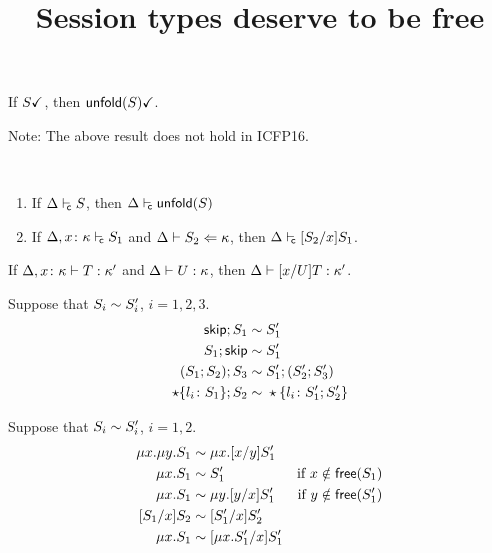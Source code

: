 \documentclass{article}
\title{Session types deserve to be free}
\begin{document}



\begin{lemma}
  If $\done S$, then $\done{\unfoldk(S)}$.  
\end{lemma}

Note: The above result does not hold in ICFP16.

\begin{lemma}\
  \begin{enumerate}
  \item If $\isContr S$, then $\isContr{\unfoldk(S)}$
  \item If $\isContr[\Delta,x\colon\kind]{S_1}$ and $\algkindin {S_2} \kind$,
    then $\isContr{\subs{S_2}{x}{S_1}}$.
  \end{enumerate}
\end{lemma}




\begin{lemma}
  If $\isType[\Delta,x\colon\kind] T\kind'$ and $\isType U\kind$, then
  $\isType{\subs xUT}{\kind'}$.
\end{lemma}


\begin{lemma}
  \label{lemma:seq-laws}
  Suppose that $S_i \TypeEquiv S'_i$, $i=1,2,3$.
  \begin{align*}
    \skipk;S_1 \TypeEquiv&\; S'_1
    \\
    S_1;\skipk \TypeEquiv&\; S_1'
    \\
    (S_1;S_2);S_3 \TypeEquiv&\; S'_1;(S'_2;S'_3)
    \\
    \star\{l_i\colon S_1\};S_2 \TypeEquiv&\; \star\{l_i\colon S'_1;S'_2\}
  \end{align*}
\end{lemma}

\begin{lemma}
\label{lemma:mu-laws}
  Suppose that $S_i \TypeEquiv S'_i$, $i=1,2$.
  \begin{align*}
    \mu x. \mu y. S_1 \TypeEquiv&\; \mu x. \subs xy{S_1'}
    \\
    \mu x.S_1 \TypeEquiv&\; S'_1 &\text{if } x \notin \free (S_1)
    \\
    \mu x.S_1 \TypeEquiv&\; \mu y.\subs yx{S_1'} &\text{if } y \notin \free (S'_1)
    \\
    \subs{S_1}{x}{S_2} \TypeEquiv&\; \subs{S_1'}{x}{S_2'}
    \\
    \mu x.S_1 \TypeEquiv&\; \subs{\mu x.S_1'}{x}{S_1'}
  \end{align*}
\end{lemma}




% 
% 
\end{document}

